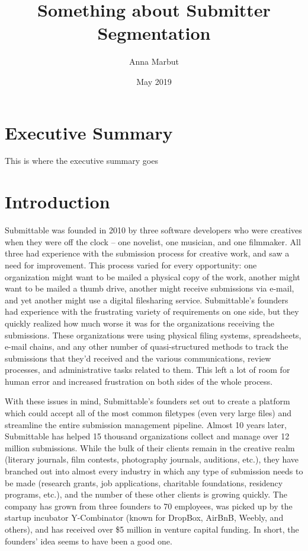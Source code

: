 \documentclass[]{report}   %
\begin{document}
\title{Something about Submitter Segmentation}   %
\author{Anna Marbut}         %
\date{May 2019}    %
\maketitle


\chapter*{Executive Summary}
\label{execsum}
  This is where the executive summary goes



\tableofcontents

\chapter{Introduction}

Submittable was founded in 2010 by three software developers who were creatives when they were off the clock -- one novelist, one musician, and one filmmaker. All three had experience with the submission process for creative work, and saw a need for improvement. This process varied for every opportunity: one organization might want to be mailed a physical copy of the work, another might want to be mailed a thumb drive, another might receive submissions via e-mail, and yet another might use a digital filesharing service. Submittable's founders had experience with the frustrating variety of requirements on one side, but they quickly realized how much worse it was for the organizations receiving the submissions. These organizations were using physical filing systems, spreadsheets, e-mail chains, and any other number of quasi-structured methods to track the submissions that they'd received and the various communications, review processes, and administrative tasks related to them. This left a lot of room for human error and increased frustration on both sides of the whole process.

With these issues in mind, Submittable's founders set out to create a platform which could accept all of the most common filetypes (even very large files) and streamline the entire submission management pipeline. Almost 10 years later, Submittable has helped 15 thousand organizations collect and manage over 12 million submissions. While the bulk of their clients remain in the creative realm (literary journals, film contests, photography journals, auditions, etc.), they have branched out into almost every industry in which any type of submission needs to be made (research grants, job applications, charitable foundations, residency programs, etc.), and the number of these other clients is growing quickly. The company has grown from three founders to 70 employees, was picked up by the startup incubator Y-Combinator (known for DropBox, AirBnB, Weebly, and others), and has received over \$5 million in venture capital funding. In short, the founders' idea seems to have been a good one.
\end{document}
